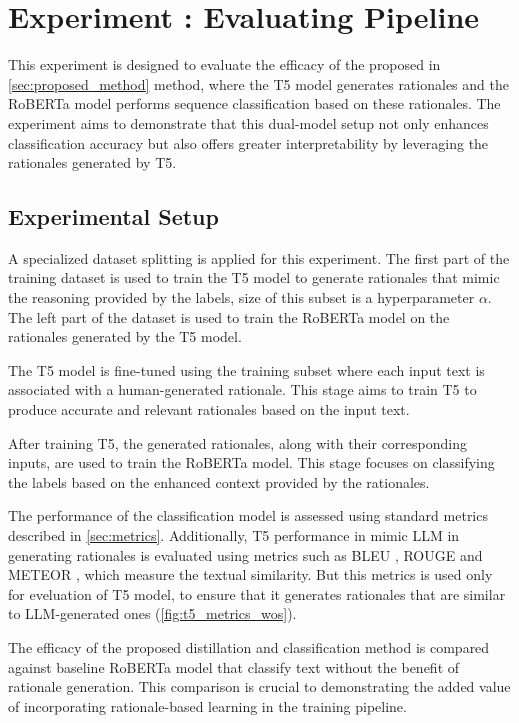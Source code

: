 \section{Experiment \theexperiment: Evaluating Pipeline}

This experiment is designed to evaluate the efficacy of the proposed in \autoref{sec:proposed_method} method, where the T5 model generates rationales and the RoBERTa model performs sequence classification based on these rationales. The experiment aims to demonstrate that this dual-model setup not only enhances classification accuracy but also offers greater interpretability by leveraging the rationales generated by T5.

\subsection*{Experimental Setup}

A specialized dataset splitting is applied for this experiment. The first part of the training dataset is used to train the T5 model to generate rationales that mimic the reasoning provided by the labels, size of this subset is a hyperparameter $\alpha$. The left part of the dataset is used to train the RoBERTa model on the rationales generated by the T5 model.

The T5 model is fine-tuned using the training subset where each input text is associated with a human-generated rationale. This stage aims to train T5 to produce accurate and relevant rationales based on the input text.

After training T5, the generated rationales, along with their corresponding inputs, are used to train the RoBERTa model. This stage focuses on classifying the labels based on the enhanced context provided by the rationales.

The performance of the classification model is assessed using standard metrics described in \autoref{sec:metrics}. Additionally, T5 performance in mimic LLM in generating rationales is evaluated using metrics such as BLEU \cite{bleu}, ROUGE \cite{rouge} and METEOR \cite{meteor}, which measure the textual similarity. But this metrics is used only for eveluation of T5 model, to ensure that it generates rationales that are similar to LLM-generated ones (\autoref{fig:t5_metrics_wos}).

The efficacy of the proposed distillation and classification method is compared against baseline RoBERTa model that classify text without the benefit of rationale generation. This comparison is crucial to demonstrating the added value of incorporating rationale-based learning in the training pipeline.

